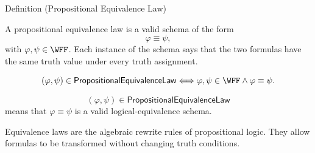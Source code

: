 \begin{definitionbox}{Definition (Propositional Equivalence Law)}
\begin{definition}
\label{def:propositional-equivalence-law}
A propositional equivalence law is a valid schema of the form
\[
\varphi\equiv\psi,
\]
with \(\varphi,\psi\in\WFF\). Each instance of the schema says that the two formulas have the same truth value under every truth assignment.
\end{definition}
\end{definitionbox}

\begin{remark*}
\[
(\varphi,\psi)\in\mathsf{PropositionalEquivalenceLaw}
\Longleftrightarrow
\varphi,\psi\in\WFF
\land
\varphi\equiv\psi.
\]
\end{remark*}

\begin{remark*}
\[
(\varphi,\psi)\in\mathsf{PropositionalEquivalenceLaw}
\]
means that \(\varphi\equiv\psi\) is a valid logical-equivalence schema.
\end{remark*}

\begin{remark*}[Interpretation]
Equivalence laws are the algebraic rewrite rules of propositional logic. They allow formulas to be transformed without changing truth conditions.
\end{remark*}

